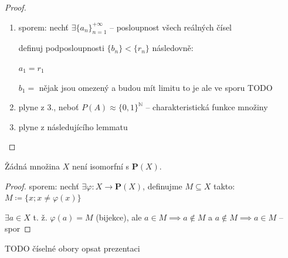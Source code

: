 \begin{proof}
  \begin{enumerate}[1.]
    \item sporem: nechť $\exists \{a_n\}_{n=1}^{+\infty}$ -- posloupnost všech reálných čísel

    definuj podposloupnosti $\{b_n\} < \{r_n\}$ následovně:

    $a_1 = r_1$

    $b_1 = $ nějak jsou omezený a budou mít limitu to je ale ve sporu TODO
    \item plyne z 3., neboť $P(A) \approx \{0,1\}^{\mathbb N}$ -- charakteristická funkce množiny
    \item plyne z následujícího lemmatu
  \end{enumerate}
\end{proof}

\begin{lemma}[X.2 Cantor]
  Žádná množina $X$ není isomorfní s $\mathbf P(X)$.
\end{lemma}

\begin{proof}
  sporem: nechť $\exists \varphi: X \to \mathbf P(X)$, definujme $M \subseteq X$ takto: $M \coloneq \{x; x \neq \varphi(x)\}$

  $\exists a \in X$ t. ž. $\varphi(a) = M$ (bijekce), ale $a \in M \implies a \notin M$ a $a \notin M \implies a \in M$ -- spor
\end{proof}

TODO číselné obory opsat prezentaci
